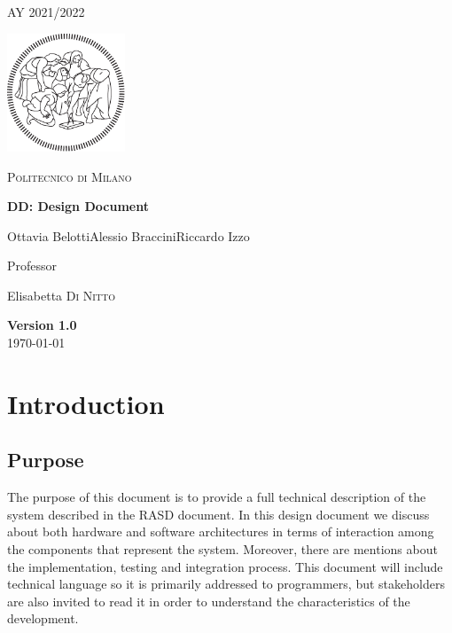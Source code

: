 \documentclass[table, 12pt]{article}
\begin{document}
\begin{titlepage}
    \centering
    {\scshape\large AY 2021/2022 \par}
    \vfill
    \includegraphics[width=100pt]{assets/logo-polimi-new}\par\vspace{1cm}
    {\scshape\LARGE Politecnico di Milano \par}
    \vspace{1.5cm}
    {\huge\bfseries DD\@: Design Document \par}
    \vspace{2cm}
    {\Large {Ottavia Belotti\quad Alessio Braccini\quad Riccardo Izzo}\par}
    \vfill
    {\large Professor\par
        Elisabetta \textsc{Di Nitto}}
    \vfill
    {\large \textbf{Version 1.0}\\ \today \par}
\end{titlepage}


\thispagestyle{plain}
\mbox{}
\newpage
{}
\tableofcontents
\newpage
{}

\section{Introduction}


\subsection{Purpose}
The purpose of this document is to provide a full technical description of the system described in the RASD document.
In this design document we discuss about both hardware and software architectures in terms of interaction among the components that represent the system.
Moreover, there are mentions about the implementation, testing and integration process.
This document will include technical language so it is primarily addressed to programmers, but stakeholders are also invited to read it in order to understand the characteristics of the development.
\end{document}
